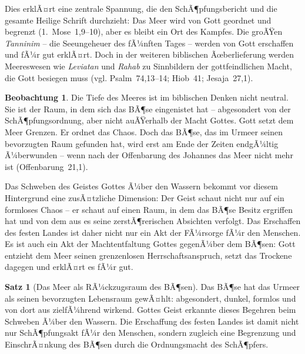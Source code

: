 ﻿\documentclass[a4paper,12pt]{article}
\theoremstyle{definition}
\newtheorem{theorem}{Satz}[section]
\newtheorem{observation}{Beobachtung}[section]
\begin{document}
Dies erklÃ¤rt eine zentrale Spannung, die den SchÃ¶pfungsbericht und die gesamte
Heilige Schrift durchzieht: Das Meer wird von Gott geordnet und begrenzt
(1.~Mose~1,9--10), aber es bleibt ein Ort des Kampfes. Die groÃŸen \textit{Tanninim}
-- die Seeungeheuer des fÃ¼nften Tages -- werden von Gott erschaffen und fÃ¼r gut
erklÃ¤rt. Doch in der weiteren biblischen Ãœberlieferung werden Meereswesen wie
\textit{Leviatan} und \textit{Rahab} zu Sinnbildern der gottfeindlichen Macht,
die Gott besiegen muss (vgl. Psalm~74,13--14; Hiob~41; Jesaja~27,1).

\begin{observation}
    Die Tiefe des Meeres ist im biblischen Denken nicht neutral. Sie ist der Raum,
    in dem sich das BÃ¶se eingenistet hat -- abgesondert von der SchÃ¶pfungsordnung,
    aber nicht auÃŸerhalb der Macht Gottes. Gott setzt dem Meer Grenzen. Er ordnet
    das Chaos. Doch das BÃ¶se, das im Urmeer seinen bevorzugten Raum gefunden hat,
    wird erst am Ende der Zeiten endgÃ¼ltig Ã¼berwunden -- wenn nach der Offenbarung
    des Johannes das Meer nicht mehr ist (Offenbarung~21,1).
\end{observation}

Das Schweben des Geistes Gottes Ã¼ber den Wassern bekommt vor diesem Hintergrund
eine zusÃ¤tzliche Dimension: Der Geist schaut nicht nur auf ein formloses Chaos --
er schaut auf einen Raum, in dem das BÃ¶se Besitz ergriffen hat und von dem aus
es seine zerstÃ¶rerischen Absichten verfolgt. Das Erschaffen des festen Landes ist
daher nicht nur ein Akt der FÃ¼rsorge fÃ¼r den Menschen. Es ist auch ein Akt der
Machtentfaltung Gottes gegenÃ¼ber dem BÃ¶sen: Gott entzieht dem Meer seinen
grenzenlosen Herrschaftsanspruch, setzt das Trockene dagegen und erklÃ¤rt es
fÃ¼r gut.

\begin{theorem}[Das Meer als RÃ¼ckzugsraum des BÃ¶sen]
    Das BÃ¶se hat das Urmeer als seinen bevorzugten Lebensraum gewÃ¤hlt: abgesondert,
    dunkel, formlos und von dort aus zielfÃ¼hrend wirkend. Gottes Geist erkannte
    dieses Begehren beim Schweben Ã¼ber den Wassern. Die Erschaffung des festen Landes
    ist damit nicht nur SchÃ¶pfungsakt fÃ¼r den Menschen, sondern zugleich eine
    Begrenzung und EinschrÃ¤nkung des BÃ¶sen durch die Ordnungsmacht des SchÃ¶pfers.
\end{theorem}

\end{document}
